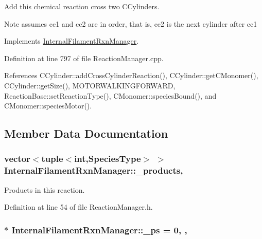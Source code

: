 Add this chemical reaction cross two C\+Cylinders. 

\begin{DoxyNote}{Note}
assumes cc1 and cc2 are in order, that is, cc2 is the next cylinder after cc1 
\end{DoxyNote}


Implements \hyperlink{classInternalFilamentRxnManager_ac8152bcd9f6aa5d69f85a98cff86d2b0}{Internal\+Filament\+Rxn\+Manager}.



Definition at line 797 of file Reaction\+Manager.\+cpp.



References C\+Cylinder\+::add\+Cross\+Cylinder\+Reaction(), C\+Cylinder\+::get\+C\+Monomer(), C\+Cylinder\+::get\+Size(), M\+O\+T\+O\+R\+W\+A\+L\+K\+I\+N\+G\+F\+O\+R\+W\+A\+R\+D, Reaction\+Base\+::set\+Reaction\+Type(), C\+Monomer\+::species\+Bound(), and C\+Monomer\+::species\+Motor().



\subsection{Member Data Documentation}
\hypertarget{classInternalFilamentRxnManager_afd213da1a3706e2e88962e5da886a5dc}{
\subsubsection[{\+\_\+products}]{\setlength{\rightskip}{0pt plus 5cm}vector$<$tuple$<$int,{\bf Species\+Type}$>$ $>$ Internal\+Filament\+Rxn\+Manager\+::\+\_\+products\hspace{0.3cm}{\ttfamily [protected]}, {\ttfamily [inherited]}}}\label{classInternalFilamentRxnManager_afd213da1a3706e2e88962e5da886a5dc}


Products in this reaction. 



Definition at line 54 of file Reaction\+Manager.\+h.

\hypertarget{classInternalFilamentRxnManager_a973ce9cc2aae811e6867afa46193c5f2}{
\subsubsection[{\+\_\+ps}]{ $\ast$ Internal\+Filament\+Rxn\+Manager\+::\+\_\+ps = 0\hspace{0.3cm}{\ttfamily [static]}, {\ttfamily [protected]}, {\ttfamily [inherited]}}}\label{classInternalFilamentRxnManager_a973ce9cc2aae811e6867afa46193c5f2}


